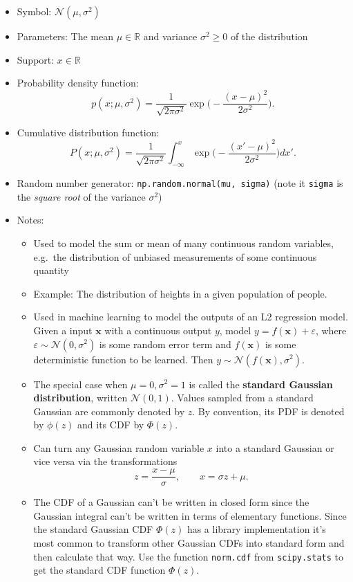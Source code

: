 \documentclass[
  letterpaper,
  DIV=11,
  numbers=noendperiod]{scrreprt}
\providecommand{\tightlist}{%
  \setlength{\itemsep}{0pt}\setlength{\parskip}{0pt}}\usepackage{longtable,booktabs,array}
\begin{document}
\begin{itemize}
\tightlist
\item
  Symbol: \(\mathcal{N}(\mu, \sigma^2)\)
\item
  Parameters: The mean \(\mu \in \mathbb{R}\) and variance
  \(\sigma^2 \geq 0\) of the distribution
\item
  Support: \(x \in \mathbb{R}\)
\item
  Probability density function:
  \[p(x; \mu , \sigma^2) = \frac{1}{\sqrt{2 \pi \sigma^2}} \exp{\bigg(-\frac{(x - \mu)^2}{2\sigma^2}\bigg)}.\]
\item
  Cumulative distribution function:
  \[P(x; \mu , \sigma^2) = \frac{1}{\sqrt{2 \pi \sigma^2}} \int_{-\infty}^x \exp{\bigg(-\frac{(x' - \mu)^2}{2\sigma^2}\bigg)} dx'.\]
\item
  Random number generator: \texttt{np.random.normal(mu,\ sigma)} (note
  it \texttt{sigma} is the \emph{square root} of the variance
  \(\sigma^2\))
\item
  Notes:

  \begin{itemize}
  \tightlist
  \item
    Used to model the sum or mean of many continuous random variables,
    e.g.~the distribution of unbiased measurements of some continuous
    quantity
  \item
    Example: The distribution of heights in a given population of
    people.
  \item
    Used in machine learning to model the outputs of an L2 regression
    model. Given a input \(\mathbf{x}\) with a continuous output \(y\),
    model \(y = f(\mathbf{x}) + \varepsilon\), where
    \(\varepsilon \sim \mathcal{N}(0,\sigma^2)\) is some random error
    term and \(f(\mathbf{x})\) is some deterministic function to be
    learned. Then \(y \sim \mathcal{N}(f(\mathbf{x}),\sigma^2)\).
  \item
    The special case when \(\mu=0, \sigma^2=1\) is called the
    \textbf{standard Gaussian distribution}, written
    \(\mathcal{N}(0,1)\). Values sampled from a standard Gaussian are
    commonly denoted by \(z\). By convention, its PDF is denoted by
    \(\phi(z)\) and its CDF by \(\Phi(z)\).
  \item
    Can turn any Gaussian random variable \(x\) into a standard Gaussian
    or vice versa via the transformations
    \[z = \frac{x-\mu}{\sigma}, \qquad x = \sigma z + \mu.\]
  \item
    The CDF of a Gaussian can't be written in closed form since the
    Gaussian integral can't be written in terms of elementary functions.
    Since the standard Gaussian CDF \(\Phi(z)\) has a library
    implementation it's most common to transform other Gaussian CDFs
    into standard form and then calculate that way. Use the function
    \texttt{norm.cdf} from \texttt{scipy.stats} to get the standard CDF
    function \(\Phi(z)\).
  \end{itemize}
\end{itemize}
\end{document}
